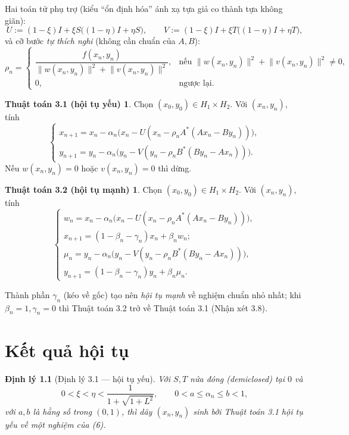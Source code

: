 \documentclass{MyBook}
\theoremstyle{plain}
\newtheorem{theorem}{Định lý}
\theoremstyle{definition}
\newtheorem*{algoA}{Thuật toán 3.1 (hội tụ yếu)}
\newtheorem*{algoB}{Thuật toán 3.2 (hội tụ mạnh)}
\newcommand{\nm}[1]{\lVert #1\rVert}
\begin{document}
Hai toán tử phụ trợ (kiểu ``ổn định hóa'' ánh xạ tựa giả co thành tựa không giãn):
\[
U:=(1-\xi)I+\xi S\bigl((1-\eta)I+\eta S\bigr),\qquad V:=(1-\xi)I+\xi T\bigl((1-\eta)I+\eta T\bigr),
\]
và cỡ bước \emph{tự thích nghi} (không cần chuẩn của $A,B$):
\[
\rho_n=\begin{cases}\dfrac{f(x_n,y_n)}{\nm{w(x_n,y_n)}^2+\nm{v(x_n,y_n)}^2}, & \text{nếu } \nm{w(x_n,y_n)}^2+\nm{v(x_n,y_n)}^2\ne 0,\\[6pt]0,&\text{ngược lại.}\end{cases}
\]

\begin{algoA}
Chọn $(x_0,y_0)\in H_1\times H_2$. Với $(x_n,y_n)$, tính
\[
\begin{cases}
x_{n+1}=x_n-\alpha_n\bigl(x_n-U(x_n-\rho_n A^{*}(Ax_n-By_n))\bigr),\\
y_{n+1}=y_n-\alpha_n\bigl(y_n-V(y_n-\rho_n B^{*}(By_n-Ax_n))\bigr).
\end{cases} \tag{7}
\]
Nếu $w(x_n,y_n)=0$ hoặc $v(x_n,y_n)=0$ thì dừng.
\end{algoA}

\begin{algoB}
Chọn $(x_0,y_0)\in H_1\times H_2$. Với $(x_n,y_n)$, tính
\[
\begin{cases}
w_n=x_n-\alpha_n\bigl(x_n-U(x_n-\rho_n A^{*}(Ax_n-By_n))\bigr),\\
x_{n+1}=(1-\beta_n-\gamma_n)x_n+\beta_n w_n;\\
\mu_n=y_n-\alpha_n\bigl(y_n-V(y_n-\rho_n B^{*}(By_n-Ax_n))\bigr),\\
y_{n+1}=(1-\beta_n-\gamma_n)y_n+\beta_n\mu_n.
\end{cases} \tag{8}
\]
\end{algoB}
\noindent Thành phần $\gamma_n$ (kéo về gốc) tạo nên \emph{hội tụ mạnh} về nghiệm chuẩn nhỏ nhất; khi $\beta_n=1,\gamma_n=0$ thì Thuật toán 3.2 trở về Thuật toán 3.1 (Nhận xét 3.8).

\chapter{Kết quả hội tụ}

\begin{theorem}[Định lý 3.1 --- hội tụ yếu]
Với $S,T$ nửa đóng (demiclosed) tại $0$ và
\[
0<\xi<\eta<\frac{1}{1+\sqrt{1+L^2}},\qquad 0<a\le\alpha_n\le b<1,
\]
với $a,b$ là hằng số trong $(0,1)$, thì dãy $(x_n,y_n)$ sinh bởi Thuật toán 3.1 hội tụ \emph{yếu} về một nghiệm của (6).
\end{theorem}
\end{document}
